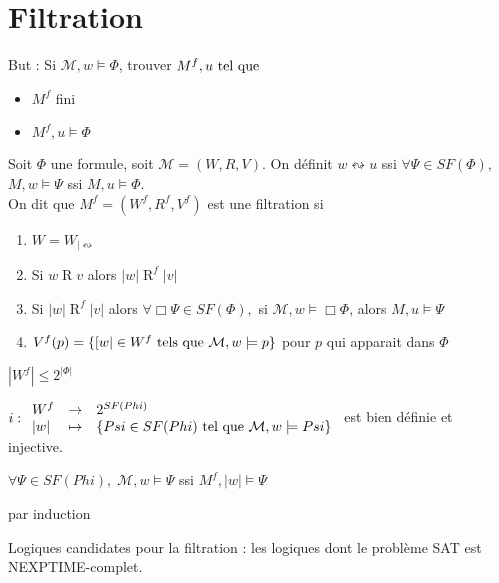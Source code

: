 \documentclass[10pt,a4paper]{article}
\newcommand{\M}{\mathcal{M}}
\DeclareMathOperator{\Ro}{R}
\begin{document}
\section{Filtration} 
But : Si $\M, w \models \Phi$, trouver $M^f, u \text{ tel que } $
\begin{itemize}
 \item $M^f$ fini
 \item $M^f, u \models \Phi$
\end{itemize}

\begin{definition}
 Soit $\Phi$ une formule, soit $\M = (W, R, V)$. On définit $w \leftrightsquigarrow u$ ssi $\forall \Psi \in SF(\Phi),$
$M, w \models \Psi$ ssi $M, u \models \Phi$.\\
On dit que $M^f = (W^f, R^f, V^f)$ est une filtration si 
\begin{enumerate}
 \item $W = W_{ |  \leftrightsquigarrow}$
 \item Si $w   \Ro v$ alors $ | w |    \Ro^f  | v | $
 \item Si $ | w |    \Ro^f  | v | $ alors $\forall \Box \Psi \in SF(\Phi), $
	si $\M, w \models \Box \Phi$, alors $M,u \models \Psi$
\item $V^f(p) = \{ [ w  |  \in W^f \tq[s] \M,w \models p \}$ pour $p$ qui apparait dans $\Phi$
\end{enumerate}

\end{definition}

\begin{prop}
$ | W^f |  \leq 2^{ | \Phi | }$
\end{prop}
\begin{dem}$ \, \\
i:
\begin{array}{lcl}
 W^f & \rightarrow & 2^{SF(Phi)}\\
  | w |  & \mapsto&  \{ Psi \in SF(Phi) \tq \M, w \models Psi \}
\end{array}$
est bien définie et injective.
\end{dem}

\begin{thm}
 $\forall \Psi \in SF(Phi),\; \M,w \models \Psi$ ssi $M^f ,  | w |  \models \Psi$
\end{thm}
\begin{dem}
 par induction
\end{dem}

Logiques candidates pour la filtration : 
les logiques dont le problème SAT est NEXPTIME-complet.
\end{document}
